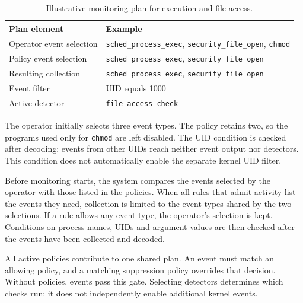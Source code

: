   \begin{table}[H]
      \centering
      \small
      \renewcommand{\arraystretch}{1.18}
      \begin{tabularx}{\textwidth}{
          @{}>{\raggedright\arraybackslash}p{}
          >{\raggedright\arraybackslash}X@{}
      }
          \toprule
          \textbf{Plan element} & \textbf{Example} \\
          \midrule
          Operator event selection &
          \texttt{sched\_process\_exec}, \texttt{security\_file\_open},
          \texttt{chmod} \\
          Policy event selection &
          \texttt{sched\_process\_exec}, \texttt{security\_file\_open} \\
          Resulting collection &
          \texttt{sched\_process\_exec}, \texttt{security\_file\_open} \\
          Event filter & UID equals 1000 \\
          Active detector & \texttt{file-access-check} \\
          \bottomrule
      \end{tabularx}
      \caption{Illustrative monitoring plan for execution and file access.}
      \label{tab:monitoring-plan-example}
  \end{table}

  The operator initially selects three event types. The policy retains two,
  so the programs used only for \texttt{chmod} are left disabled.
  The UID condition is checked after decoding: events from other UIDs reach
  neither event output nor detectors. This condition does not automatically
  enable the separate kernel UID filter.

  Before monitoring starts, the system compares the events selected
  by the operator with those listed in the policies. When all rules that admit
  activity list the events they need, collection is limited to the event types
  shared by the two selections. If a rule allows any event type, the operator's
  selection is kept. Conditions on process names, UIDs and argument values
  are then checked after the events have been collected and decoded.

  All active policies contribute to one shared plan. An event must match an
  allowing policy, and a matching suppression policy overrides that decision.
  Without policies, events pass this gate. Selecting detectors determines
  which checks run; it does not independently enable additional kernel events.

